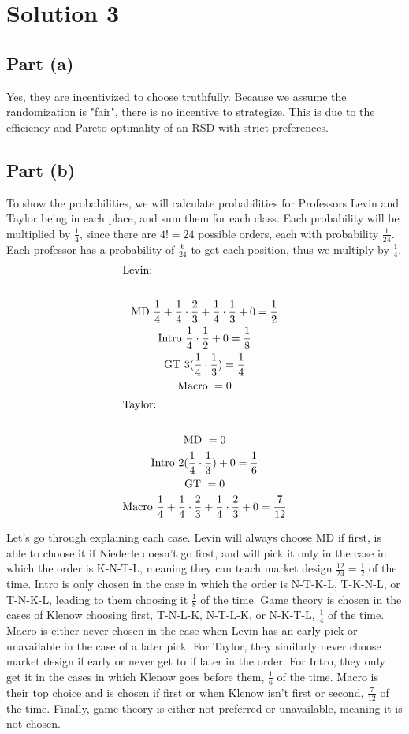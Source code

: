 \documentclass[10pt,a4paper]{article}
\begin{document}
\section*{Solution 3}
  \subsection*{Part (a)}
    Yes, they are incentivized to choose truthfully. Because we assume the randomization is "fair", there is no incentive to strategize. This is due to the efficiency and Pareto optimality of an RSD with strict preferences.
  \subsection*{Part (b)}
    To show the probabilities, we will calculate probabilities for Professors Levin and Taylor being in each place, and sum them for each class. Each probability will be multiplied by $\frac{1}{4}$, since there are $4! = 24$ possible orders, each with probability $\frac{1}{24}$. Each professor has a probability of $\frac{6}{24}$ to get each position, thus we multiply by $\frac{1}{4}$. 
    \begin{gather*}
      \shortintertext{Levin:} \\
      \text{MD} \ \frac{1}{4} + \frac{1}{4}\cdot\frac{2}{3} + \frac{1}{4}\cdot\frac{1}{3} + 0 = \frac{1}{2} \\
      \text{Intro} \ \frac{1}{4}\cdot\frac{1}{2} + 0 = \frac{1}{8} \\
      \text{GT} \ 3(\frac{1}{4}\cdot\frac{1}{3}) = \frac{1}{4} \\
      \text{Macro} \ = 0 \\
      \shortintertext{Taylor:} \\
      \text{MD} \ = 0 \\
      \text{Intro} \ 2(\frac{1}{4}\cdot\frac{1}{3}) + 0 = \frac{1}{6} \\
      \text{GT} \  = 0 \\
      \text{Macro} \ \frac{1}{4} + \frac{1}{4}\cdot\frac{2}{3} + \frac{1}{4}\cdot\frac{2}{3} + 0 = \frac{7}{12} \\
    \end{gather*}

    Let's go through explaining each case. Levin will always choose MD if first, is able to choose it if Niederle doesn't go first, and will pick it only in the case in which the order is K-N-T-L, meaning they can teach market design $\frac{12}{24} = \frac{1}{2}$ of the time. Intro is only chosen in the case in which the order is N-T-K-L, T-K-N-L, or T-N-K-L, leading to them choosing it $\frac{1}{8}$ of the time. Game theory is chosen in the cases of Klenow choosing first, T-N-L-K, N-T-L-K, or N-K-T-L, $\frac{1}{4}$ of the time. Macro is either never chosen in the case when Levin has an early pick or unavailable in the case of a later pick. For Taylor, they similarly never choose market design if early or never get to if later in the order. For Intro, they only get it in the cases in which Klenow goes before them, $\frac{1}{6}$ of the time. Macro is their top choice and is chosen if first or when Klenow isn't first or second, $\frac{7}{12}$ of the time. Finally, game theory is either not preferred or unavailable, meaning it is not chosen. 
\end{document}
